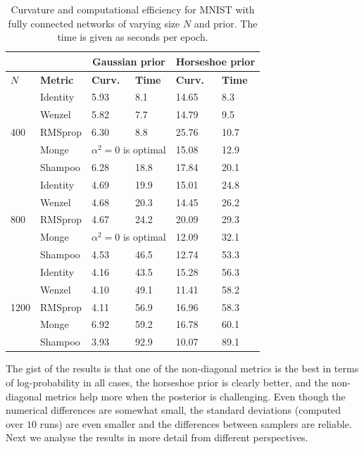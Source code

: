 \documentclass[10pt]{article} %
\theoremstyle{plain}
\theoremstyle{definition}
\theoremstyle{remark}
\begin{document}
\begin{table}[t]
\begin{center}
\begin{tabular}{ll|ll|ll}
 & & \multicolumn{2}{c}{Gaussian prior} &
 \multicolumn{2}{c}{Horseshoe prior} \\
\hline
$N$ & {\bf Metric}                   & {\bf Curv.} & {\bf Time}
& {\bf Curv.} & {\bf Time} \\
\hline
\multirow{5}{1em}{400} & 
Identity & 
5.93 & 8.1 &
14.65 & 8.3 \\
& Wenzel  & 
5.82  & 7.7 &
14.79 & 9.5 \\
& RMSprop &
6.30 & 8.8 & 
25.76 & 10.7 \\
& Monge   &
\multicolumn{2}{c|}{$\alpha^{2}=0$ is optimal} &
15.08 & 12.9 \\
& Shampoo &
6.28 & 18.8 &
17.84 & 20.1 \\
\hline
\multirow{5}{1em}{800} & 
Identity & 
4.69 & 19.9 &
15.01 & 24.8 \\
& Wenzel  & 
4.68 & 20.3 &
14.45 & 26.2 \\
& RMSprop &
4.67 & 24.2 &
20.09 & 29.3 \\
& Monge   &
\multicolumn{2}{c|}{$\alpha^{2}=0$ is optimal} &
12.09 & 32.1 \\
& Shampoo &
4.53 & 46.5 &
12.74  & 53.3 \\
\hline
\multirow{5}{1em}{1200} & 
Identity & 
4.16 & 43.5 &
15.28 & 56.3 \\
& Wenzel & 
4.10 & 49.1 &
11.41 & 58.2 \\
& RMSprop &
4.11 & 56.9 &
16.96  & 58.3 \\
& Monge   &
6.92 & 59.2 &
16.78 & 60.1 \\
& Shampoo &
3.93 & 92.9 &
10.07 & 89.1\\
\hline
\end{tabular}
\caption{Curvature and computational efficiency for MNIST with fully connected networks of varying size $N$ and prior. The time is given as seconds per epoch.}
\label{table:mnist2}
\end{center}
\end{table}

The gist of the results is that one of the non-diagonal metrics is the best in terms of log-probability in all cases, the horseshoe prior is clearly better, and the non-diagonal metrics help more when the posterior is challenging. Even though the numerical differences are somewhat small, the standard deviations (computed over $10$ runs) are even smaller and the differences between samplers are reliable. Next we analyse the results in more detail from different perspectives.
\end{document}
